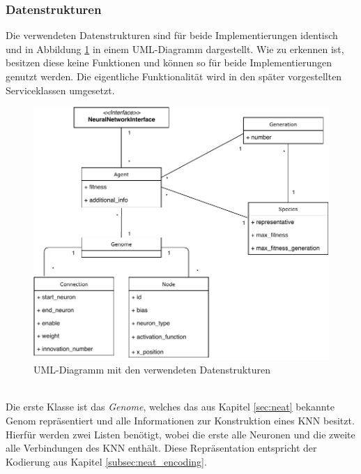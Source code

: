 \subsubsection{Datenstrukturen}
\label{subsubsec:data_structures}
Die verwendeten Datenstrukturen sind für beide Implementierungen identisch und in Abbildung \ref{fig:class_diagramm} in einem UML-Diagramm dargestellt. Wie zu erkennen ist, besitzen diese keine Funktionen und können so für beide Implementierungen genutzt werden. Die eigentliche Funktionalität wird in den später vorgestellten Serviceklassen umgesetzt.
\begin{figure}[!h]
	\centering
	\includegraphics[width=1\textwidth]{./img/uml/class_diagramm.pdf} 
	\caption{UML-Diagramm mit den verwendeten Datenstrukturen}
	\label{fig:class_diagramm}
\end{figure}
\\ \noindent
Die erste Klasse ist das \emph{Genome}, welches das aus Kapitel \ref{sec:neat} bekannte Genom repräsentiert und alle Informationen zur Konstruktion eines \ac{KNN} besitzt. Hierfür werden zwei Listen benötigt, wobei die erste alle Neuronen und die zweite alle Verbindungen des \ac{KNN} enthält. Diese Repräsentation entspricht der Kodierung aus Kapitel \ref{subsec:neat_encoding}. 
\\\\

